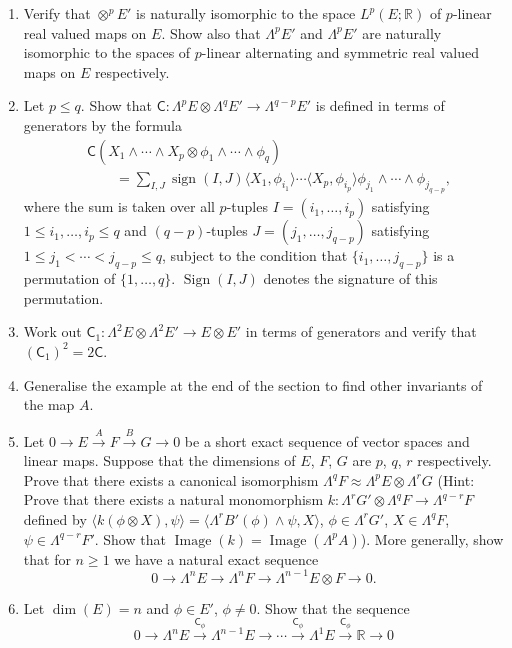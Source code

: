 \begin{enumerate}
\item Verify that $\otimes^p E'$ is naturally isomorphic to the space $L^p(E;\mathbb R)$ of $p$-linear real valued maps on $E$. Show also that $\Lambda^p E'$ and $\Lambda^p E'$ are naturally isomorphic to the spaces of $p$-linear alternating and symmetric real valued maps on $E$ respectively.
\item Let $p\leq q$. Show that $\mathsf C:\Lambda^p E\otimes\Lambda^q E'\to\Lambda^{q-p}E'$ is defined in terms of generators by the formula
\[
\begin{split}
&\mathsf C(X_1\wedge\cdots\wedge X_p\otimes\phi_1\wedge\cdots\wedge\phi_q)\\
&\qquad=\sum_{I,J}\operatorname{sign}(I,J)\langle X_1,\phi_{i_1}\rangle\cdots\langle X_p,\phi_{i_p}\rangle\phi_{j_1}\wedge\cdots\wedge\phi_{j_{q-p}},
\end{split}
\]
where the sum is taken over all $p$-tuples $I=(i_1,\ldots,i_p)$ satisfying $1\leq i_1,\ldots,i_p\leq q$ and $(q-p)$-tuples $J=(j_1,\ldots,j_{q-p})$ satisfying $1\leq j_1<\cdots<j_{q-p}\leq q$, subject to the condition that $\{i_1,\ldots,j_{q-p}\}$ is a permutation of $\{1,\ldots,q\}$. $\operatorname{Sign}(I,J)$ denotes the signature of this permutation.
\item Work out $\mathsf C_1:\Lambda^2 E\otimes\Lambda^2 E'\to E\otimes E'$ in terms of generators and verify that $(\mathsf C_1)^2=2\mathsf C$.
\item Generalise the example at the end of the section to find other invariants of the map $A$.
\item Let $0\to E\xrightarrow{A}F\xrightarrow{B}G\to0$ be a short exact sequence of vector spaces and linear maps. Suppose that the dimensions of $E$, $F$, $G$ are $p$, $q$, $r$ respectively. Prove that there exists a canonical isomorphism $\Lambda^q F\approx\Lambda^p E\otimes\Lambda^r G$ (Hint: Prove that there exists a natural monomorphism $k:\Lambda^r G'\otimes\Lambda^q F\to\Lambda^{q-r}F$ defined by $\langle k(\phi\otimes X),\psi\rangle=\langle\Lambda^r B'(\phi)\wedge\psi,X\rangle$, $\phi\in\Lambda^r G'$, $X\in\Lambda^q F$, $\psi\in\Lambda^{q-r}F'$. Show that $\operatorname{Image}(k)=\operatorname{Image}(\Lambda^p A)$). More generally, show that for $n\geq1$ we have a natural exact sequence
\[
0\to\Lambda^n E\to\Lambda^n F\to\Lambda^{n-1}E\otimes F\to0.
\]
\item Let $\dim(E)=n$ and $\phi\in E'$, $\phi\neq0$. Show that the sequence
\[
0\to\Lambda^n E\xrightarrow{\mathsf C_\phi}\Lambda^{n-1}E\to\cdots\xrightarrow{\mathsf C_\phi}\Lambda^1 E\xrightarrow{\mathsf C_\phi}\mathbb R\to0
\]
\end{enumerate}
